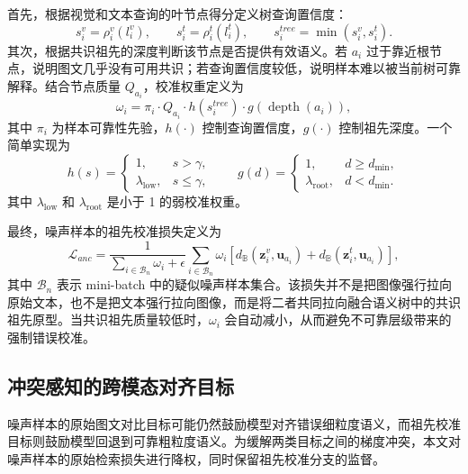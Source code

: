 首先，根据视觉和文本查询的叶节点得分定义树查询置信度：
\begin{equation}
    s_i^v = \rho_i^v(l_i^v),
    \qquad
    s_i^t = \rho_i^t(l_i^t),
    \qquad
    s_i^{tree}=\min(s_i^v,s_i^t).
\end{equation}
其次，根据共识祖先的深度判断该节点是否提供有效语义。若 $a_i$ 过于靠近根节点，说明图文几乎没有可用共识；若查询置信度较低，说明样本难以被当前树可靠解释。结合节点质量 $Q_{a_i}$，校准权重定义为
\begin{equation}
    \omega_i
    =
    \pi_i
    \cdot
    Q_{a_i}
    \cdot
    h(s_i^{tree})
    \cdot
    g(\operatorname{depth}(a_i)),
\end{equation}
其中 $\pi_i$ 为样本可靠性先验，$h(\cdot)$ 控制查询置信度，$g(\cdot)$ 控制祖先深度。一个简单实现为
\begin{equation}
    h(s)=
    \begin{cases}
    1, & s>\gamma,\\
    \lambda_{\mathrm{low}}, & s\leq\gamma,
    \end{cases}
    \qquad
    g(d)=
    \begin{cases}
    1, & d\geq d_{\min},\\
    \lambda_{\mathrm{root}}, & d<d_{\min}.
    \end{cases}
\end{equation}
其中 $\lambda_{\mathrm{low}}$ 和 $\lambda_{\mathrm{root}}$ 是小于 1 的弱校准权重。

最终，噪声样本的祖先校准损失定义为
\begin{equation}
    \mathcal{L}_{anc}
    =
    \frac{1}{\sum_{i\in\mathcal{B}_n}\omega_i+\epsilon}
    \sum_{i\in\mathcal{B}_n}
    \omega_i
    \left[
    d_{\mathbb{B}}(\boldsymbol{z}_i^v,\boldsymbol{u}_{a_i})
    +
    d_{\mathbb{B}}(\boldsymbol{z}_i^t,\boldsymbol{u}_{a_i})
    \right],
\end{equation}
其中 $\mathcal{B}_n$ 表示 mini-batch 中的疑似噪声样本集合。该损失并不是把图像强行拉向原始文本，也不是把文本强行拉向图像，而是将二者共同拉向融合语义树中的共识祖先原型。当共识祖先质量较低时，$\omega_i$ 会自动减小，从而避免不可靠层级带来的强制错误校准。

\subsection{冲突感知的跨模态对齐目标}

噪声样本的原始图文对比目标可能仍然鼓励模型对齐错误细粒度语义，而祖先校准目标则鼓励模型回退到可靠粗粒度语义。为缓解两类目标之间的梯度冲突，本文对噪声样本的原始检索损失进行降权，同时保留祖先校准分支的监督。

